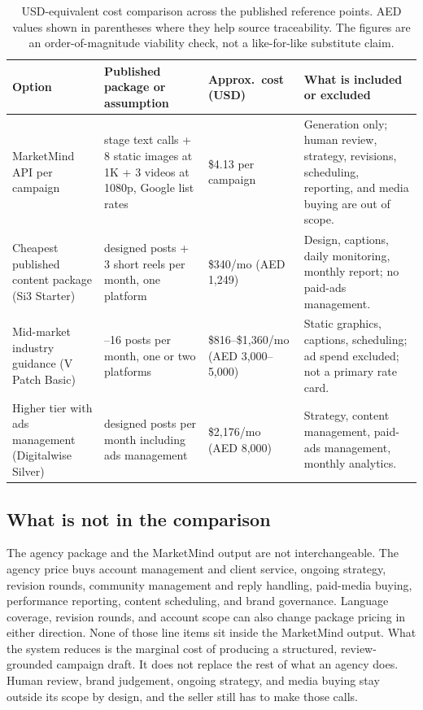 \documentclass[12pt,a4paper]{report}
\begin{document}
\begin{table}[ht!]
  \centering
  \caption{USD-equivalent cost comparison across the published reference points. AED values shown in parentheses where they help source traceability. The figures are an order-of-magnitude viability check, not a like-for-like substitute claim.}
  \label{tab:costcompare}
  \small
  \begin{tabular}{@{}>{\raggedright\arraybackslash}p{1.55in}>{\raggedright\arraybackslash}p{1.55in}>{\raggedright\arraybackslash}p{0.95in}>{\raggedright\arraybackslash}p{1.55in}@{}}
    \toprule
    Option & Published package or assumption & Approx.\ cost (USD) & What is included or excluded \\
    \midrule
    MarketMind API per campaign & 3 stage text calls + 8 static images at 1K + 3 videos at 1080p, Google list rates~\cite{googlepricing2026} & \$4.13 per campaign & Generation only; human review, strategy, revisions, scheduling, reporting, and media buying are out of scope. \\
    \addlinespace
    Cheapest published content package (Si3 Starter)~\cite{si3packages} & 9 designed posts + 3 short reels per month, one platform & \$340/mo (AED 1,249) & Design, captions, daily monitoring, monthly report; no paid-ads management. \\
    \addlinespace
    Mid-market industry guidance (V Patch Basic)~\cite{vpatchpricing} & 12--16 posts per month, one or two platforms & \$816--\$1,360/mo (AED 3,000--5,000) & Static graphics, captions, scheduling; ad spend excluded; not a primary rate card. \\
    \addlinespace
    Higher tier with ads management (Digitalwise Silver)~\cite{digitalwisepackages} & 10 designed posts per month including ads management & \$2,176/mo (AED 8,000) & Strategy, content management, paid-ads management, monthly analytics. \\
    \bottomrule
  \end{tabular}
\end{table}

\subsection*{What is not in the comparison}

The agency package and the MarketMind output are not interchangeable. The agency price buys account management and client service, ongoing strategy, revision rounds, community management and reply handling, paid-media buying, performance reporting, content scheduling, and brand governance. Language coverage, revision rounds, and account scope can also change package pricing in either direction. None of those line items sit inside the MarketMind output. What the system reduces is the marginal cost of producing a structured, review-grounded campaign draft. It does not replace the rest of what an agency does. Human review, brand judgement, ongoing strategy, and media buying stay outside its scope by design, and the seller still has to make those calls.
\end{document}
